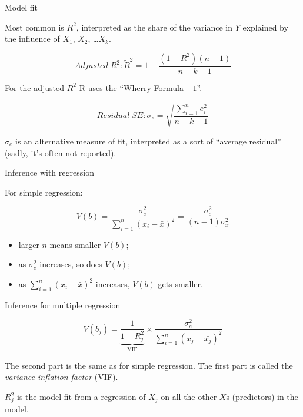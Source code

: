 \documentclass[12pt,english,pdf,xcolor=dvipsnames,aspectratio=169,handout]{beamer}\usepackage[]{graphicx}\usepackage[]{xcolor}
\begin{document}
\begin{frame}{Model fit}

Most common is $R^2$, interpreted as the share of the variance in $Y$ explained by the influence of $X_1$, $X_2$, \dots $X_k$.\bigskip

\begin{equation}
Adjusted\; R^2:\tilde{R}^2 = 1 - \frac{(1-R^2)(n-1)}{n-k-1}
\end{equation}

For the adjusted $R^2$ \textsf{R} uses the ``Wherry Formula $-1$''.\bigskip

\begin{equation}
Residual\; SE: \sigma_e = \sqrt{\frac{\sum_{i=1}^ne_i^2}{n-k-1}}
\end{equation}

$\sigma_e$ is an alternative measure of fit, interpreted as a sort of ``average residual'' (sadly, it's often not reported).

\end{frame}



\begin{frame}{Inference with regression}

For simple regression:

\begin{equation}
V(b) = \frac{\sigma_e^2}{\sum_{i=1}^n(x_i - \bar{x})^2} = \frac{\sigma_e^2}{(n-1)\sigma_x^2}
\end{equation}

\begin{itemize}
\item larger $n$ means smaller $V(b)$;
\item as $\sigma_e^2$ increases, so does $V(b)$;
\item as $\sum_{i=1}^{n}(x_i - \bar{x})^2$ increases, $V(b)$ gets smaller.
\end{itemize}

\end{frame}


\begin{frame}{Inference for multiple regression}

\begin{equation}
V(b_j) = \underbrace{\frac{1}{1 - R_j^2}}_\text{VIF} \times \frac{\sigma_e^2}{\sum_{i=1}^n(x_{j} - \bar{x_j})^2}
\end{equation}

The second part is the same as for simple regression. The first part is called the \textit{variance inflation factor} (VIF).\bigskip

$R_j^2$ is the model fit from a regression of $X_j$ on all the other $X$s (predictors) in the model.

\end{frame}
\end{document}
